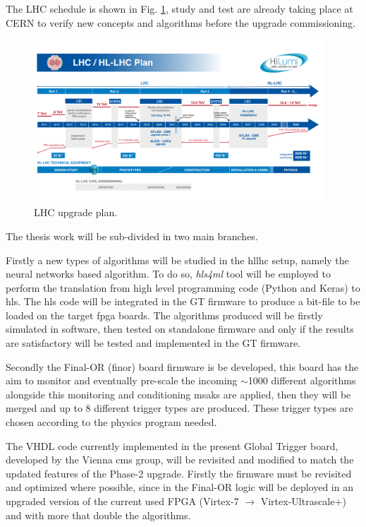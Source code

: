 \documentclass[../../main.tex]{subfiles}
\begin{document}
The LHC schedule is shown in Fig. \ref{fig:lhc-plan}, study and test are already taking place at CERN to verify new concepts and algorithms before the upgrade commissioning.
    
\begin{figure}[h]
    \centering
    \includegraphics[width=0.97\textwidth]{sections/01/Images/HL-LHC_Janvier2022.pdf}
    \caption{LHC upgrade plan.}
    \label{fig:lhc-plan}
\end{figure}
    
The thesis work will be sub-divided in two main branches.
    
Firstly a new types of algorithms will be studied in the \acrshort{hllhc} setup, namely the neural networks based algorithm. To do so, \textit{hls4ml} tool will be employed to perform the translation from high level programming code (Python and Keras) to \acrfull{hls}. The \acrshort{hls} code will be  integrated in the GT firmware to produce a bit-file to be loaded on the target \acrfull{fpga} boards. The algorithms produced will be firstly simulated in software, then tested on standalone firmware and only if the results are satisfactory will be tested and implemented in the GT firmware.
    
Secondly the Final-OR (finor) board firmware is be developed, this board has the aim to monitor and eventually pre-scale the incoming $\sim$1000 different algorithms alongside this monitoring and conditioning msaks are applied, then they will be merged and up to 8 different trigger types are produced. These trigger types are chosen according to the physics program needed.  
    
The VHDL code currently implemented in the present Global Trigger board, developed by the Vienna \acrshort{cms} group, will be revisited and modified to match the updated features of the Phase-2 upgrade. Firstly the firmware must be revisited and optimized where possible, since in the Final-OR logic will be deployed in an upgraded version of the current used FPGA (Virtex-7 $\to$ Virtex-Ultrascale$+$) and with more that double the algorithms.  
    
\end{document}
